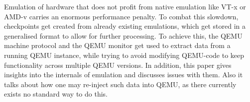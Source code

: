 
\Abstract
Emulation of hardware that does not profit from native emulation like VT-x or AMD-v carries an enormous performance penalty.
To combat this slowdown, checkpoints get created from already existing emulations,
which get stored in a generalised format to allow for further processing.
To achieve this, the QEMU  machine protocol and the QEMU monitor get used to extract data from a running QEMU instance,
while trying to avoid modifying QEMU-code to keep functionality across multiple QEMU versions.
In addition, this paper gives insights into the internals of emulation and discusses issues with them.
Also it talks about how one may re-inject such data into QEMU,
as there currently exists no standard way to do this.